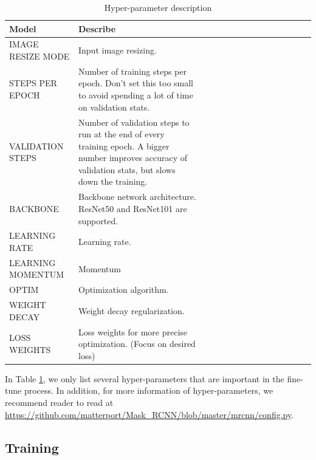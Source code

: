 	\begin{table}[H]
		\begin{tabularx}{1\textwidth} {
				| >{\raggedright\arraybackslash}X 
				| >{\raggedright\arraybackslash}X
				| >{\raggedright\arraybackslash}X 
				| >{\raggedright\arraybackslash}X
				| >{\raggedright\arraybackslash}X
				| >{\raggedright\arraybackslash}X
				| >{\raggedright\arraybackslash}X
				| >{\raggedright\arraybackslash}X
				| >{\raggedright\arraybackslash}X
				| >{\raggedright\arraybackslash}X
				| >{\raggedright\arraybackslash}X
				| >{\raggedright\arraybackslash}X
				| >{\raggedright\arraybackslash}X
				| >{\raggedright\arraybackslash}X  
				| >{\raggedright\arraybackslash}X | }
			\hline
			Model & Describe \\
			\hline
			IMAGE RESIZE MODE & Input image resizing. \\
			\hline
			STEPS PER EPOCH & Number of training steps per epoch. Don't set this too small to avoid spending a lot of time on validation stats. \\
			\hline
			VALIDATION STEPS & Number of validation steps to run at the end of every training epoch. A bigger number improves accuracy of validation stats, but slows down the training. \\
			\hline
			BACKBONE & Backbone network architecture. ResNet50 and ResNet101 are supported. \\
			\hline
			LEARNING RATE & Learning rate. \\
			\hline
			LEARNING MOMENTUM & Momentum \\
			\hline
			OPTIM & Optimization algorithm. \\
			\hline
			WEIGHT DECAY & Weight decay regularization. \\
			\hline
			LOSS WEIGHTS & Loss weights for more precise optimization. (Focus on desired loss) \\
			\hline
			
		\end{tabularx}
		\caption{Hyper-parameter description}
		\label{table:hyperparameters}
		
	\end{table}
	
	In Table \ref{table:hyperparameters}, we only list several hyper-parameters that are important in the fine-tune process. In addition, for more information of hyper-parameters, we recommend reader to read at \url{https://github.com/matterport/Mask_RCNN/blob/master/mrcnn/config.py}.
	
\subsection{Training}
\label{subsection:mrcnn_training}
\noindent

